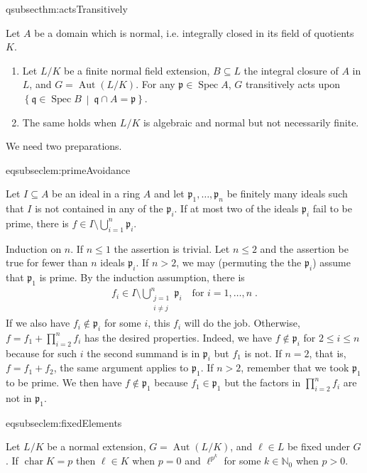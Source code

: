 \documentclass[DIV=14,parskip=full,pointednumbers]{scrartcl}
\newenvironment{alphanumerate}{\begin{enumerate}[label={$(\alph*)$},ref=\curthm]}{\end{enumerate}}
\theoremstyle{cthm}
\theoremstyle{cvarthm}
\renewenvironment{proof}[1][\proofname]
{\pushQED{\qed}\topsep0pt \partopsep0pt\trivlist\item[\hskip\labelsep\itshape #1.] }{\popQED\endtrivlist\addvspace{6pt plus 6pt}}
\theoremstyle{cdef}
\newcommand{\lbl}[1]{
	\label{#1}
	\ifmmode
	\expandafter\xdef\csname eqsubsec#1\endcsname{\thesubsection}
	\fi
}
\newcommand{\IN}{\mathbb{N}}
\newcommand{\pp}{\mathfrak{p}}
\newcommand{\qq}{\mathfrak{q}}
\newcommand{\Aut}{\operatorname{Aut}}
\newcommand{\Spec}{\operatorname{Spec}}
\newcommand{\cha}{\operatorname{char}}
\newcommand{\st}{\ \middle|\ }
\begin{document}
	\begin{thm}\lbl{thm:actsTransitively}
		Let $A$ be a domain which is normal, i.e. integrally closed in its field of quotients $K$. 
		\begin{alphanumerate}
		\item 
			Let $L/K$ be a finite normal field extension, $B\subseteq L$ the integral closure of $A$ in $L$, and $G = \Aut(L/K)$. For any $\pp\in\Spec A$, $G$ transitively acts upon $\left\{\qq\in\Spec B\st \qq\cap A = \pp\right\}$. 
		\item
			The same holds when $L/K$ is algebraic and normal but not necessarily finite.
		\end{alphanumerate}
	\end{thm}
	We need two preparations.
	\begin{lem}\lbl{lem:primeAvoidance}
		Let $I\subseteq A$ be an ideal in a ring $A$ and let $\pp_1,\ldots,\pp_n$ be finitely many ideals such that $I$ is not contained in any of the $\pp_i$. If at most two of the ideals $\pp_i$ fail to be prime, there is $f\in I\setminus\bigcup_{i=1}^n\pp_i$.
	\end{lem}
	\begin{proof}
		Induction on $n$. If $n\leq 1$ the assertion is trivial. Let $n\leq 2$ and the assertion be true for fewer than $n$ ideals $\pp_i$. If $n>2$, we may (permuting the the $\pp_i$) assume that $\pp_1$ is prime. By the induction assumption, there is 
		\begin{align*}
			f_i\in I\setminus \bigcup_{\substack{j = 1\\i\not=j}}^n \pp_i\quad\text{for }i=1,\ldots,n\;. 
		\end{align*}
		If we also have $f_i\not \in \pp_i$ for some $i$, this $f_i$ will do the job. Otherwise, $f= f_1+\prod_{i=2}^nf_i$ has the desired properties. Indeed, we have $f\not\in\pp_i$ for $2\leq i\leq n$ because for such $i$ the second summand is in $\pp_i$ but $f_1$ is not. If $n=2$, that is, $f=f_1+f_2$, the same argument applies to $\pp_1$. If $n>2$, remember that we took $\pp_1$ to be prime. We then have $f\not\in \pp_1$ because $f_1\in\pp_1$ but the factors in $\prod_{i=2}^nf_i$ are not in $\pp_1$.
	\end{proof}
	\begin{lem}\lbl{lem:fixedElements}
		Let $L/K$ be a normal extension, $G=\Aut(L/K)$, and $\ell\in L$ be fixed under $G$. If $\cha K = p$ then $\ell\in K$ when $p=0$ and $\ell^{p^k}$ for some $k\in\IN_0$ when $p>0$.
	\end{lem}
\end{document}
